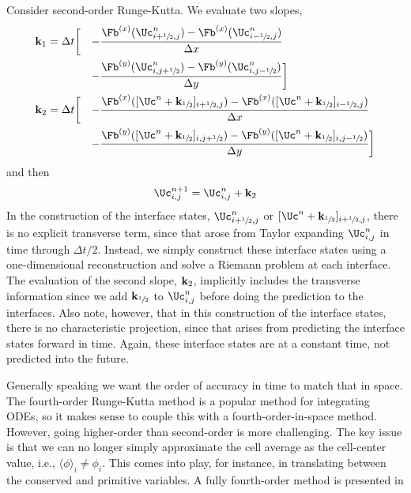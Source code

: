 Consider
second-order Runge-Kutta.  We evaluate two slopes,
\begin{alignat}{3}
{\bf k}_1 &= \Delta t \bigg [ &-&\frac{\Fb^{(x)}(\Uc^n_{i+\myhalf,j})
                               - \Fb^{(x)}(\Uc^n_{i-\myhalf,j})}{\Delta x} \nonumber \\
    &\,                 &-&\frac{\Fb^{(y)}(\Uc^n_{i,j+\myhalf})
                               - \Fb^{(y)}(\Uc^n_{i,j-\myhalf})}{\Delta y} \bigg ] \\
{\bf k}_2 &= \Delta t \bigg [ &-&\frac{\Fb^{(x)}([\Uc^n + {\bf k}_\myhalf]_{i+\myhalf,j})
                               - \Fb^{(x)}([\Uc^n + {\bf k}_\myhalf]_{i-\myhalf,j})}{\Delta x} \nonumber \\
    &\,                 &-&\frac{\Fb^{(y)}([\Uc^n + {\bf k}_\myhalf]_{i,j+\myhalf})
                               - \Fb^{(y)}([\Uc^n + {\bf k}_\myhalf]_{i,j-\myhalf})}{\Delta y} \bigg ]
\end{alignat}
and then
\begin{equation}
\Uc^{n+1}_{i,j} = \Uc^n_{i,j} + {\bf k}_2
\end{equation}
In the construction of the interface states, $\Uc^n_{i+\myhalf,j}$ or $[\Uc^n
+ {\bf k}_\myhalf]_{i+\myhalf,j}$, there is no explicit transverse term, since that
arose from Taylor expanding $\Uc^n_{i,j}$ in time through $\Delta t/2$.
Instead, we simply construct these interface states using a
one-dimensional reconstruction and solve a Riemann problem at each
interface.  The evaluation of the second slope, ${\bf k}_2$, implicitly
includes the transverse information since we add ${\bf k}_{\sfrac{1}{2}}$ to
$\Uc^n_{i,j}$ before doing the prediction to the interfaces.  Also note,
however, that in this construction of the interface states, there is
no characteristic projection, since that arises from predicting the
interface states forward in time.  Again, these interface states are
at a constant time, not predicted into the future.

Generally speaking we want the order of accuracy in time to match that
in space.  The fourth-order Runge-Kutta method is a popular method for
integrating ODEs, so it makes sense to couple this with a
fourth-order-in-space method.  However, going higher-order than
second-order is more challenging.  The key issue is that we can no
longer simply approximate the cell average as the cell-center value,
i.e., $\langle \phi\rangle_i \ne \phi_i$.  This comes into play, for
instance, in translating between the conserved and primitive variables.
A fully fourth-order method is presented in ~\cite{mccorquodalecolella}

